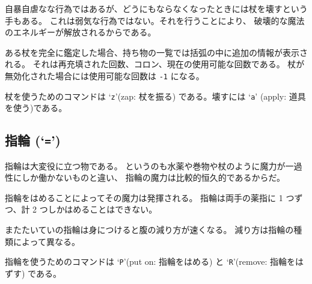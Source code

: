 自暴自虐なな行為ではあるが、どうにもならなくなったときには杖を壊すという手もある。
これは弱気な行為ではない。それを行うことにより、
破壊的な魔法のエネルギーが解放されるからである。

ある杖を完全に鑑定した場合、持ち物の一覧では括弧の中に追加の情報が表示される。
それは再充填された回数、コロン、現在の使用可能な回数である。
杖が無効化された場合には使用可能な回数は {\tt -1} になる。

杖を使うためのコマンドは `{\tt z}'(zap: 杖を振る) である。壊すには `{\tt a}'
(apply: 道具を使う)である。

\subsection*{指輪 (`{\tt =}')}

指輪は大変役に立つ物である。
というのも水薬や巻物や杖のように魔力が一過性にしか働かないものと違い、
指輪の魔力は比較的恒久的であるからだ。

指輪をはめることによってその魔力は発揮される。
指輪は両手の薬指に 1 つずつ、計 2 つしかはめることはできない。

またたいていの指輪は身につけると腹の減り方が速くなる。
減り方は指輪の種類によって異なる。

指輪を使うためのコマンドは `{\tt P}'(put on: 指輪をはめる) と
`{\tt R}'(remove: 指輪をはずす) である。

